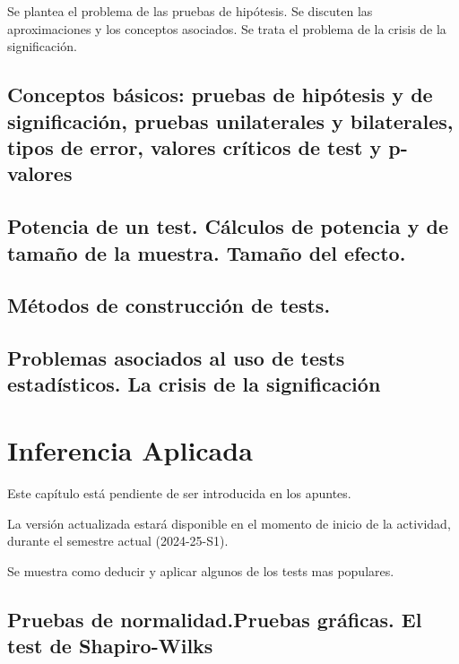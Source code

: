 \documentclass[
  a4paper,
  DIV=11,
  numbers=noendperiod]{scrreprt}
\begin{document}
Se plantea el problema de las pruebas de hipótesis. Se discuten las
aproximaciones y los conceptos asociados. Se trata el problema de la
crisis de la significación.

\section{Conceptos básicos: pruebas de hipótesis y de significación,
pruebas unilaterales y bilaterales, tipos de error, valores críticos de
test y
p-valores}\label{conceptos-buxe1sicos-pruebas-de-hipuxf3tesis-y-de-significaciuxf3n-pruebas-unilaterales-y-bilaterales-tipos-de-error-valores-cruxedticos-de-test-y-p-valores}

\section{Potencia de un test. Cálculos de potencia y de tamaño de la
muestra. Tamaño del
efecto.}\label{potencia-de-un-test.-cuxe1lculos-de-potencia-y-de-tamauxf1o-de-la-muestra.-tamauxf1o-del-efecto.}

\section{Métodos de construcción de
tests.}\label{muxe9todos-de-construcciuxf3n-de-tests.}

\section{Problemas asociados al uso de tests estadísticos. La crisis de
la
significación}\label{problemas-asociados-al-uso-de-tests-estaduxedsticos.-la-crisis-de-la-significaciuxf3n}


\chapter{Inferencia Aplicada}\label{inferencia-aplicada}

Este capítulo está pendiente de ser introducida en los apuntes.

La versión actualizada estará disponible en el momento de inicio de la
actividad, durante el semestre actual (2024-25-S1).

Se muestra como deducir y aplicar algunos de los tests mas populares.

\section{Pruebas de normalidad.Pruebas gráficas. El test de
Shapiro-Wilks}\label{pruebas-de-normalidad.pruebas-gruxe1ficas.-el-test-de-shapiro-wilks}
\end{document}
